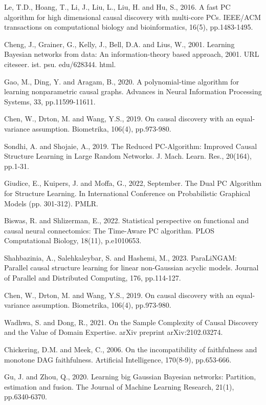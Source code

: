 \documentclass{article}
\begin{document}
\begin{thebibliography}{1}
{
Le, T.D., Hoang, T., Li, J., Liu, L., Liu, H. and Hu, S., 2016. A fast PC algorithm for high dimensional causal discovery with multi-core PCs. IEEE/ACM transactions on computational biology and bioinformatics, 16(5), pp.1483-1495.

Cheng, J., Grainer, G., Kelly, J., Bell, D.A. and Lius, W., 2001. Learning Bayesian networks from data: An information-theory based approach, 2001. URL citeseer. ist. psu. edu/628344. html.

Gao, M., Ding, Y. and Aragam, B., 2020. A polynomial-time algorithm for learning nonparametric causal graphs. Advances in Neural Information Processing Systems, 33, pp.11599-11611.

Chen, W., Drton, M. and Wang, Y.S., 2019. On causal discovery with an equal-variance assumption. Biometrika, 106(4), pp.973-980.

Sondhi, A. and Shojaie, A., 2019. The Reduced PC-Algorithm: Improved Causal Structure Learning in Large Random Networks. J. Mach. Learn. Res., 20(164), pp.1-31.

Giudice, E., Kuipers, J. and Moffa, G., 2022, September. The Dual PC Algorithm for Structure Learning. In International Conference on Probabilistic Graphical Models (pp. 301-312). PMLR.

Biswas, R. and Shlizerman, E., 2022. Statistical perspective on functional and causal neural connectomics: The Time-Aware PC algorithm. PLOS Computational Biology, 18(11), p.e1010653.

Shahbazinia, A., Salehkaleybar, S. and Hashemi, M., 2023. ParaLiNGAM: Parallel causal structure learning for linear non-Gaussian acyclic models. Journal of Parallel and Distributed Computing, 176, pp.114-127.

Chen, W., Drton, M. and Wang, Y.S., 2019. On causal discovery with an equal-variance assumption. Biometrika, 106(4), pp.973-980.

Wadhwa, S. and Dong, R., 2021. On the Sample Complexity of Causal Discovery and the Value of Domain Expertise. arXiv preprint arXiv:2102.03274.

Chickering, D.M. and Meek, C., 2006. On the incompatibility of faithfulness and monotone DAG faithfulness. Artificial Intelligence, 170(8-9), pp.653-666.

Gu, J. and Zhou, Q., 2020. Learning big Gaussian Bayesian networks: Partition, estimation and fusion. The Journal of Machine Learning Research, 21(1), pp.6340-6370.

}
\end{thebibliography}
\end{document}
